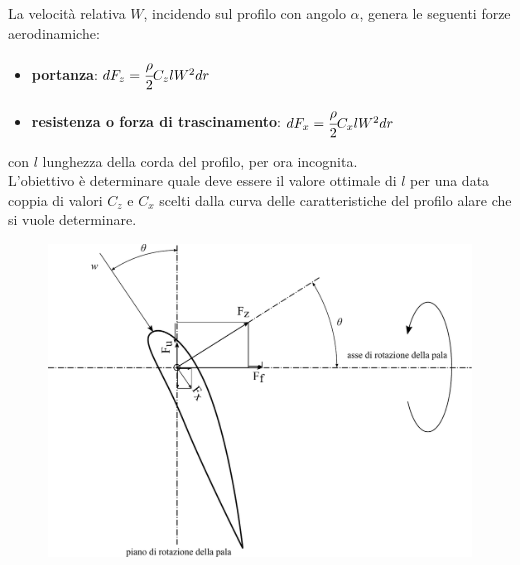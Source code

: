 La velocità relativa $W$, incidendo sul profilo con angolo $\alpha$, genera le seguenti forze aerodinamiche:
\begin{itemize}
	\item \textbf{portanza}: $dF_z = \cfrac{\rho}{2} C_z l W^2 dr$
	\item \textbf{resistenza o forza di trascinamento}: $dF_x = \cfrac{\rho}{2} C_x l W^2 dr$
\end{itemize}
con $l$ lunghezza della corda del profilo, per ora incognita.\\
L'obiettivo è determinare quale deve essere il valore ottimale di $l$ per una data coppia di valori $C_z$ e $C_x$ scelti dalla curva delle caratteristiche del profilo alare che si vuole determinare. 
\begin{figure}[h!]
\centering
  \includegraphics[width=.9\textwidth]{fig/forzeEol.pdf}
\caption{}
\label{fig:forzeEol}
\end{figure}

